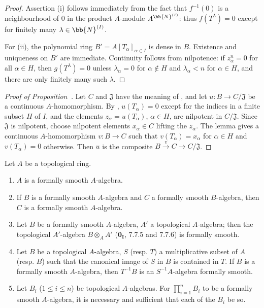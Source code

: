 \begin{proof}
Assertion (i) follows immediately from the fact that $f^{-1}(0)$ is a neighbourhood of $0$ in the product $A$-module $A^{\bb{N}^{(I)}}$: thus $f(T^\lambda)=0$ except for finitely many $\lambda\in\bb{N}^{(I)}$.

For (ii), the polynomial ring $B'=A[T_\alpha]_{\alpha\in I}$ is dense in $B$.
Existence and uniqueness on $B'$ are immediate.
Continuity follows from nilpotence: if $z_\alpha^n=0$ for all $\alpha\in H$, then $g(T^\lambda)=0$ unless $\lambda_\alpha=0$ for $\alpha\notin H$ and $\lambda_\alpha<n$ for $\alpha\in H$, and there are only finitely many such $\lambda$.
\end{proof}

\begin{proof}[Proof of Proposition~{\rm{}}]
Let $C$ and $\mathfrak{J}$ have the meaning of , and let $u:B\to C/\mathfrak{J}$ be a continuous $A$-homomorphism.
By , $u(T_\alpha)=0$ except for the indices in a finite subset $H$ of $I$, and the elements $z_\alpha=u(T_\alpha)$, $\alpha\in H$, are nilpotent in $C/\mathfrak{J}$.
Since $\mathfrak{J}$ is nilpotent, choose nilpotent elements $x_\alpha\in C$ lifting the $z_\alpha$.
The lemma gives a continuous $A$-homomorphism $v:B\to C$ such that $v(T_\alpha)=x_\alpha$ for $\alpha\in H$ and $v(T_\alpha)=0$ otherwise.
Then $u$ is the composite $B\xrightarrow{v}C\to C/\mathfrak{J}$.
\end{proof}

\begin{proposition}[19.3.5]
\label{0.19.3.5}
Let $A$ be a topological ring.
\begin{enumerate}
  \item[(i)] $A$ is a formally smooth $A$-algebra.
  \item[(ii)] If $B$ is a formally smooth $A$-algebra and $C$ a formally smooth $B$-algebra, then $C$ is a formally smooth $A$-algebra.
  \item[(iii)] Let $B$ be a formally smooth $A$-algebra, $A'$ a topological $A$-algebra;
  then the topological $A'$-algebra $B\otimes_A A'$ ($\mathbf{0_I}$, 7.7.5 and 7.7.6) is formally smooth.
  \item[(iv)] Let $B$ be a topological $A$-algebra, $S$ (resp. $T$) a multiplicative subset of $A$ (resp. $B$) such that the canonical image of $S$ in $B$ is contained in $T$.
  If $B$ is a formally smooth $A$-algebra, then $T^{-1}B$ is an $S^{-1}A$-algebra formally smooth.
  \item[(v)] Let $B_i$ ($1\leq i\leq n$) be topological $A$-algebras.
  For $\prod_{i=1}^n B_i$ to be a formally smooth $A$-algebra, it is necessary and sufficient that each of the $B_i$ be so.
\end{enumerate}
\end{proposition}

